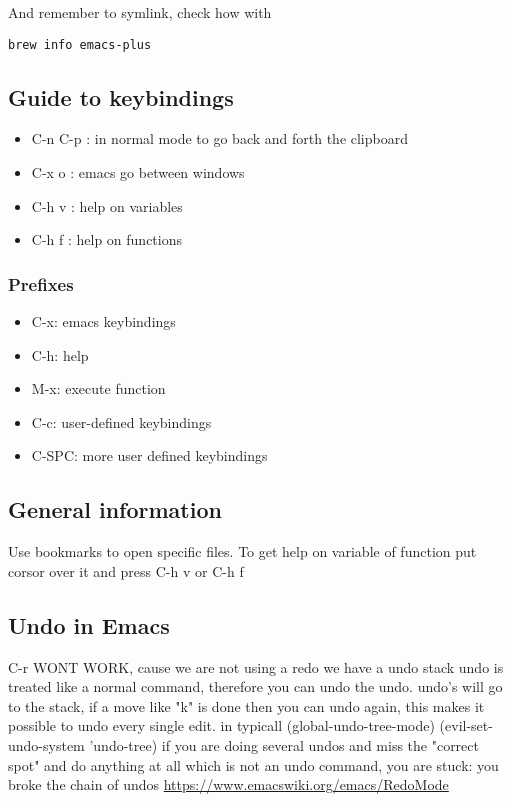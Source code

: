\documentclass[11pt]{article}
\begin{document}
And remember to symlink, check how with
\begin{verbatim}
brew info emacs-plus
\end{verbatim}
\subsection{Guide to keybindings}
\label{sec:org17067e4}
\begin{itemize}
\item C-n C-p : in normal mode to go back and forth the clipboard
\item C-x o : emacs go between windows
\item C-h v : help on variables
\item C-h f : help on functions
\end{itemize}

\subsubsection{Prefixes}
\label{sec:org3133685}
\begin{itemize}
\item C-x: emacs keybindings
\item C-h: help
\item M-x: execute function
\item C-c: user-defined keybindings
\item C-SPC: more user defined keybindings
\end{itemize}

\subsection{General information}
\label{sec:org57fe0cf}
Use bookmarks to open specific files.
To get help on variable of function put corsor over it and press C-h v or C-h f

\subsection{Undo in Emacs}
\label{sec:org846c622}

C-r WONT WORK, cause we are not using a redo we have a undo stack
undo is treated like a normal command, therefore you can undo the undo.
undo's will go to the stack, if a move like "k" is done then you can undo again, this makes it possible to undo every single edit.
in typicall (global-undo-tree-mode) (evil-set-undo-system 'undo-tree)
if you are doing several undos and miss the "correct spot" and do anything at all which is not an undo command, you are stuck: you broke the chain of undos \url{https://www.emacswiki.org/emacs/RedoMode}
\end{document}
